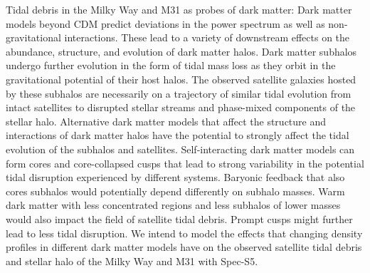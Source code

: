 
Tidal debris in the Milky Way and M31 as probes of dark matter:
Dark matter models beyond CDM predict deviations in the power spectrum as well as non-gravitational interactions. These lead to a variety of downstream effects on the abundance, structure, and evolution of dark matter halos. Dark matter subhalos undergo further evolution in the form of tidal mass loss as they orbit in the gravitational potential of their host halos. The observed satellite galaxies hosted by these subhalos are necessarily on a trajectory of similar tidal evolution from intact satellites to disrupted stellar streams and phase-mixed components of the stellar halo. Alternative dark matter models that affect the structure and interactions of dark matter halos have the potential to strongly affect the tidal evolution of the subhalos and satellites. Self-interacting dark matter models can form cores and core-collapsed cusps that lead to strong variability in the potential tidal disruption experienced by different systems. Baryonic feedback that also cores subhalos would potentially depend differently on subhalo masses. Warm dark matter with less concentrated regions and less subhalos of lower masses would also impact the field of satellite tidal debris. Prompt cusps might further lead to less tidal disruption. We intend to model the effects that changing density profiles in different dark matter models have on the observed satellite tidal debris and stellar halo of the Milky Way and M31 with Spec-S5.

